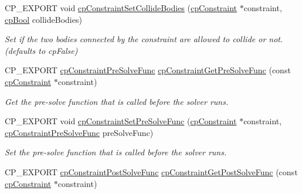 \begin{DoxyCompactItemize}
\mbox{\label{group__cp_constraint_ga4083314e3017e089d43ea6baa8c93adf}} 
C\+P\+\_\+\+E\+X\+P\+O\+RT void \mbox{\hyperlink{group__cp_constraint_ga4083314e3017e089d43ea6baa8c93adf}{cp\+Constraint\+Set\+Collide\+Bodies}} (\mbox{\hyperlink{structcp_constraint}{cp\+Constraint}} $\ast$constraint, \mbox{\hyperlink{group__basic_types_gabc5e752c48f3449ca26ef413ecbd647e}{cp\+Bool}} collide\+Bodies)
\begin{DoxyCompactList}\small\item\em Set if the two bodies connected by the constraint are allowed to collide or not. (defaults to cp\+False) \end{DoxyCompactList}\item 
\mbox{\label{group__cp_constraint_ga7d42a75c670eb34e590f66b7a2de70f9}} 
C\+P\+\_\+\+E\+X\+P\+O\+RT \mbox{\hyperlink{group__cp_constraint_gaf6038a155d58f45d6ab977dd1b1398de}{cp\+Constraint\+Pre\+Solve\+Func}} \mbox{\hyperlink{group__cp_constraint_ga7d42a75c670eb34e590f66b7a2de70f9}{cp\+Constraint\+Get\+Pre\+Solve\+Func}} (const \mbox{\hyperlink{structcp_constraint}{cp\+Constraint}} $\ast$constraint)
\begin{DoxyCompactList}\small\item\em Get the pre-\/solve function that is called before the solver runs. \end{DoxyCompactList}\item 
\mbox{\label{group__cp_constraint_gac2dfaa821d91dc3e0ad4c31568e92c8c}} 
C\+P\+\_\+\+E\+X\+P\+O\+RT void \mbox{\hyperlink{group__cp_constraint_gac2dfaa821d91dc3e0ad4c31568e92c8c}{cp\+Constraint\+Set\+Pre\+Solve\+Func}} (\mbox{\hyperlink{structcp_constraint}{cp\+Constraint}} $\ast$constraint, \mbox{\hyperlink{group__cp_constraint_gaf6038a155d58f45d6ab977dd1b1398de}{cp\+Constraint\+Pre\+Solve\+Func}} pre\+Solve\+Func)
\begin{DoxyCompactList}\small\item\em Set the pre-\/solve function that is called before the solver runs. \end{DoxyCompactList}\item 
\mbox{\label{group__cp_constraint_gab7bad11fece5dc9349626227925e4438}} 
C\+P\+\_\+\+E\+X\+P\+O\+RT \mbox{\hyperlink{group__cp_constraint_ga2208378297a7265d0cc69f31697961b9}{cp\+Constraint\+Post\+Solve\+Func}} \mbox{\hyperlink{group__cp_constraint_gab7bad11fece5dc9349626227925e4438}{cp\+Constraint\+Get\+Post\+Solve\+Func}} (const \mbox{\hyperlink{structcp_constraint}{cp\+Constraint}} $\ast$constraint)

\end{DoxyCompactItemize}
